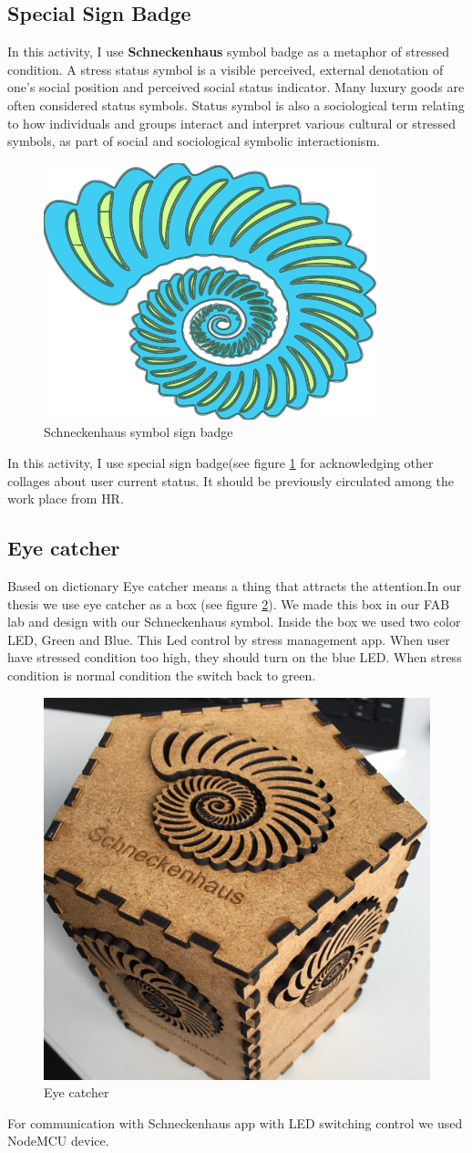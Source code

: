 \subsection{Special Sign Badge}
In this activity, I use \textbf{Schneckenhaus} symbol badge as a metaphor of stressed condition. A stress status symbol is a visible perceived, external denotation of one's social position and perceived social status indicator.\citep{Cherrington1994OrganizationalBehavior} Many luxury goods are often considered status symbols. Status symbol is also a sociological term relating to how individuals and groups interact and interpret various cultural or stressed symbols, as part of social and sociological symbolic interactionism.
\begin{figure}[hbt!] 
  \centering
  \includegraphics[width=0.4\linewidth]{chap4/image4/logo1.png}
  \caption[Schneckenhaus symbol sign badge ]{Schneckenhaus symbol sign badge}
  \label{fig:Sign_badge}
\end{figure}
In this activity, I use special sign badge(see figure \ref{fig:Sign_badge} for acknowledging other collages about user current status. It should be previously circulated among the work place from \acs{HR}.
\subsection{Eye catcher}
Based on dictionary Eye catcher means a thing that attracts the attention.In our thesis we use eye catcher as a box (see figure \ref{fig:eye}). We made this box in our FAB lab and design with our Schneckenhaus symbol. Inside the box we used two color LED, Green and Blue. This Led control by stress management app.  When user have stressed condition too high, they should turn on the blue LED. When stress condition is normal condition the switch back to green. 
\begin{figure}[hbt!] 
  \centering
  \includegraphics[width=0.5\linewidth]{chap4/image4/skn2.png}
  \caption[Eye catcher ]{Eye catcher}
  \label{fig:eye}
\end{figure}
For communication with Schneckenhaus app with LED switching control we used NodeMCU device.

